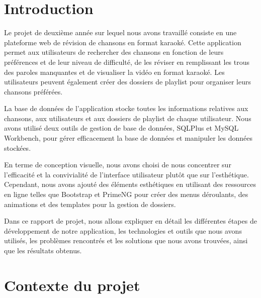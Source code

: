 \documentclass[12pt,french]{article}
\begin{document}
\newpage


\renewcommand{\contentsname}{Table des matières}
\normalsize\tableofcontents %

\newpage

\vspace*{0.01cm}

\section*{Introduction}

Le projet de deuxième année sur lequel nous avons travaillé consiste en une plateforme web de révision de chansons en format karaoké. Cette application permet aux utilisateurs de rechercher des chansons en fonction de leurs préférences et de leur niveau de difficulté, de les réviser en remplissant les trous des paroles manquantes et de visualiser la vidéo en format karaoké. Les utilisateurs peuvent également créer des dossiers de playlist pour organiser leurs chansons préférées.

\medskip

La base de données de l'application stocke toutes les informations relatives aux chansons, aux utilisateurs et aux dossiers de playlist de chaque utilisateur. Nous avons utilisé deux outils de gestion de base de données, SQLPlus et MySQL Workbench, pour gérer efficacement la base de données et manipuler les données stockées.

\medskip

En terme de conception visuelle, nous avons choisi de nous concentrer sur l'efficacité et la convivialité de l'interface utilisateur plutôt que sur l'esthétique. Cependant, nous avons ajouté des éléments esthétiques en utilisant des ressources en ligne telles que Bootstrap et PrimeNG pour créer des menus déroulants, des animations et des templates pour la gestion de dossiers.

\medskip

Dans ce rapport de projet, nous allons expliquer en détail les différentes étapes de développement de notre application, les technologies et outils que nous avons utilisés, les problèmes rencontrés et les solutions que nous avons trouvées, ainsi que les résultats obtenus.


\section{Contexte du projet}
\end{document}
